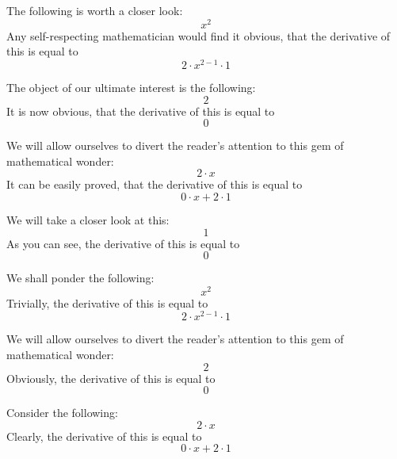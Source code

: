\documentclass{article}
\begin{document}
The following is worth a closer look:
\begin{equation}
x ^{2 } 
\end{equation}
Any self-respecting mathematician would find it obvious, that the derivative of this is equal to
\begin{equation}
2 \cdot x ^{2 - 1 } \cdot 1 
\end{equation}

The object of our ultimate interest is the following:
\begin{equation}
2 
\end{equation}
It is now obvious, that the derivative of this is equal to
\begin{equation}
0 
\end{equation}

We will allow ourselves to divert the reader's attention to this gem of mathematical wonder:
\begin{equation}
2 \cdot x 
\end{equation}
It can be easily proved, that the derivative of this is equal to
\begin{equation}
0 \cdot x + 2 \cdot 1 
\end{equation}

We will take a closer look at this:
\begin{equation}
1 
\end{equation}
As you can see, the derivative of this is equal to
\begin{equation}
0 
\end{equation}

We shall ponder the following:
\begin{equation}
x ^{2 } 
\end{equation}
Trivially, the derivative of this is equal to
\begin{equation}
2 \cdot x ^{2 - 1 } \cdot 1 
\end{equation}

We will allow ourselves to divert the reader's attention to this gem of mathematical wonder:
\begin{equation}
2 
\end{equation}
Obviously, the derivative of this is equal to
\begin{equation}
0 
\end{equation}

Consider the following:
\begin{equation}
2 \cdot x 
\end{equation}
Clearly, the derivative of this is equal to
\begin{equation}
0 \cdot x + 2 \cdot 1 
\end{equation}
\end{document}
